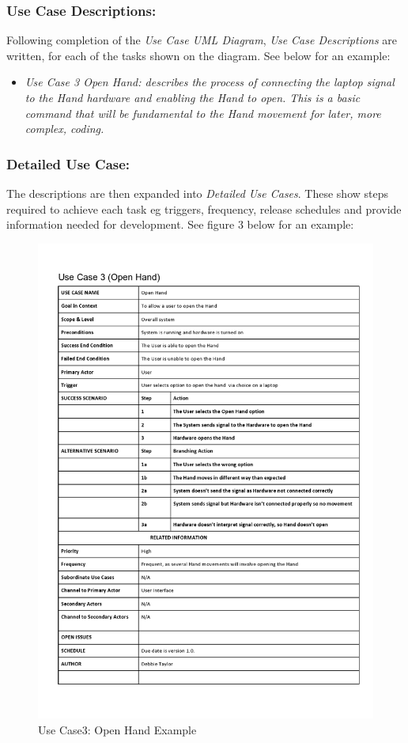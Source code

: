 \documentclass[progress]{cmpreport}
\begin{document}
\subsubsection{Use Case Descriptions:}

Following completion of the \textit{Use Case UML Diagram}, \textit{Use Case Descriptions} are written, for each of the tasks shown on the diagram. See below for an example:

\begin{itemize}		
	\item \textit{Use Case 3 Open Hand: describes the process of connecting the laptop signal to the Hand hardware and enabling the Hand to open. This is a basic command that will be fundamental to the Hand movement for later, more complex, coding.}
\end{itemize}

\subsubsection{Detailed Use Case:}

The descriptions are then expanded into \textit{Detailed Use Cases}. These show steps required to achieve each task eg triggers, frequency, release schedules and provide information needed for development. See figure 3 below for an example:

\begin{figure}[H] 
	\caption{Use Case3: Open Hand Example}
	\centering
	\includegraphics[trim=0cm 7cm 0cm 0.63cm, width=0.9 \textwidth, height=0.629 \textheight]{photos/UseCase_OpenHand.jpg}
\end{figure}
\end{document}
